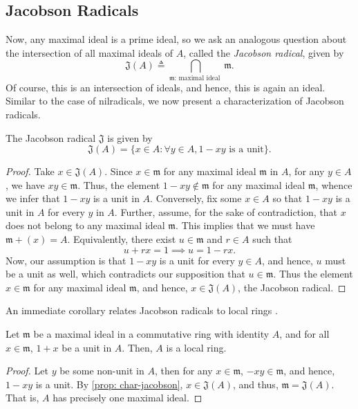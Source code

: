 \subsection{Jacobson Radicals}
Now, any maximal ideal is a prime ideal, so we ask an analogous question about the intersection of all maximal ideals of $A$, called the {\it Jacobson radical}, given by
\[\mathfrak{J}(A)\triangleq \bigcap_{\mathfrak{m}\text {: maximal ideal }} \mathfrak{m}.\] 
Of course, this is an intersection of ideals, and hence, this is again an ideal. Similar to the case of nilradicals, we now present a characterization of Jacobson radicals.
\begin{proposition}\label{prop: char-jacobson}
The Jacobson radical $\mathfrak{J}$ is given by
    \[\mathfrak{J}(A)=\{x \in A\colon \forall y \in A, 1-x y\text{ is a unit}\}.\]
\end{proposition}
\begin{proof}
    Take $x \in \mathfrak{J}(A)$. Since $x \in \mathfrak{m}$ for any maximal ideal $\mathfrak{m}$ in $A$, for any $y \in A$, we have
    $x y \in \mathfrak{m}$. Thus, the element $1-x y \notin \mathfrak{m}$ for any maximal ideal $\mathfrak{m}$, whence we infer that $1-x y$ is a unit in $A$. Conversely, fix some $x \in A$ so that $1-xy$ is a unit in $A$ for every $y$ in $A$. Further, assume, for the sake of contradiction, that $x$ does not belong to any maximal ideal $\mathfrak{m}$. This implies that we must have
    \(\mathfrak{m}+(x)=A.\) Equivalently, there exist $u \in \mathfrak{m}$ and $r \in A$ such that 
    \[u+r x=1 \implies u = 1-rx.\]
    Now, our assumption is that $1-x y$ is a unit for every $y \in A$, and hence, $u$ must be a unit as well, which contradicts our supposition that $u \in \mathfrak{m}$. Thus the element $x \in \mathfrak{m}$ for any maximal ideal $\mathfrak{m}$, and hence, $x \in \mathfrak{J}(A)$, the Jacobson radical.
\end{proof}
An immediate corollary relates Jacobson radicals to local rings .
\begin{corollary}
    Let $\mathfrak{m}$ be a maximal ideal in a commutative ring with identity $A$, and for all $x \in \mathfrak{m}$, $1+x$ be a unit in $A$. Then, $A$ is a local ring.
\end{corollary} 
\begin{proof}
    Let $y$ be some non-unit in $A$, then for any $x \in \mathfrak{m}$, $-xy \in \mathfrak{m}$, and hence, $1-xy$ is a unit. By \cref{prop: char-jacobson}, $x \in \mathfrak{J}(A)$, and thus, $\mathfrak{m} = \mathfrak{J}(A)$. That is, $A$ has precisely one maximal ideal.
\end{proof}

